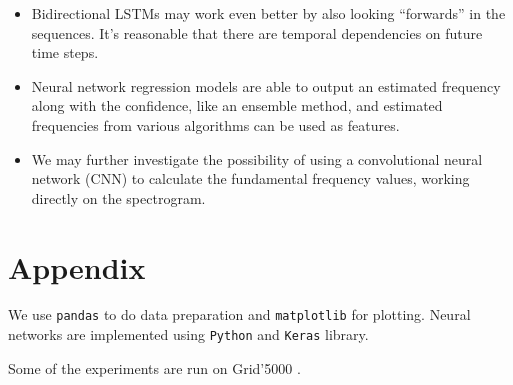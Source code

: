 \documentclass[11pt,a4paper]{report}
\begin{document}
\begin{itemize}
  \item Bidirectional LSTMs may work even better by also looking \enquote{forwards} in the sequences.
    It's reasonable that there are temporal dependencies on future time steps.
  \item Neural network regression models are able to output an estimated frequency along with the confidence, like an ensemble method, and estimated frequencies from various algorithms can be used as features.
  \item We may further investigate the possibility of using a convolutional neural network (CNN) to calculate the fundamental frequency values, working directly on the spectrogram.
\end{itemize}

\appendix

\chapter{Appendix}

We use \texttt{pandas} \parencite{mckinney2010data} to do data preparation and \texttt{matplotlib} \parencite{hunter2007matplotlib} for plotting.
Neural networks are implemented using \texttt{Python} and \texttt{Keras} \parencite{chollet2015keras} library.

Some of the experiments are run on Grid'5000 \parencite{balouek2012adding}.

\printbibliography
\end{document}
